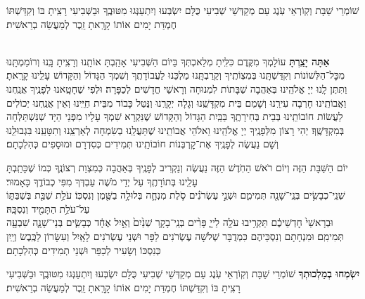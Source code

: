 \shabmusafpesukim

שׁוֹמְרֵי שַׁבָּת וְקֽוֹרְאֵי עֹֽנֶג \middot עַם מְקַדְּשֵׁי שְׁבִיעִי כֻּלָּם יִשְׂבְּעוּ וְיִתְעַנְּגוּ מִטּוּבֶֽךָ \middot וּבַשְּׁבִיעִי רָצִֽיתָ בּוֹ וְקִדַּשְׁתּוֹ \middot חֶמְדַּת יָמִים אוֹתוֹ קָרָֽאתָ זֵֽכֶר לְמַעֲשֵׂה בְרֵאשִׁית׃

\shabboskiddushhayom{} 

\begin{sometimes}

\label{shabbosroshchodesh}
\\
\textbf{אַתָּה יָצַֽרְתָּ}
עוֹלָמְךָ מִקֶּֽדֶם כִּלִּֽיתָ מְלַאכְתְּךָ בַּיוֹם הַשְּׁבִיעִי \middot אָהַֽבְתָּ אוֹתָֽנוּ וְרָצִֽיתָ בָּֽנוּ וְרוֹמַמְתָּֽנוּ מִכׇּל־הַלְּשׁוֹנוֹת וְקִדַּשְׁתָּֽנוּ בְּמִצְוֹתֶֽיךָ וְקֵרַבְתָּֽנוּ מַלְכֵּנוּ לַעֲבוֹדָתֶֽךָ וְשִׁמְךָ הַגָּדוֹל וְהַקָּדוֹשׁ עָלֵֽינוּ קָרָֽאתָ׃ וַתִּתֶּן לָֽנוּ יְיָ אֱלֹהֵֽינוּ בְּאַהֲבָה שַׁבָּתוֹת לִמְנוּחָה וְרָאשֵׁי חֳדָשִׁים לְכַפָּרָה׃ וּלְפִי שֶׁחָטָֽאנוּ לְפָנֶֽיךָ אֲנַֽחְנוּ וַאֲבוֹתֵֽינוּ חָרְבָה עִירֵֽנוּ וְשָׁמֵם בֵּית מִקְדָּשֵֽׁנוּ וְגָלָה יְקָרֵֽנוּ וְנֻּטַּל כָּבוֹד מִבֵּית חַיֵּֽינוּ \middot וְאֵין אֲנַֽחְנוּ יְכוֹלִים לַעֲשׂוֹת חוֹבוֹתֵֽינוּ בְּבֵית בְּחִירָתֶֽךָ בַּבַּֽיִת הַגָּדוֹל וְהַקָּדוֹשׁ שֶׁנִּקְרָא שִׁמְךָ עָלָיו מִפְּנֵי הַיָּד שְׁנִּשְׁתַּלְּחָה בְּמִקְדָּשֶֽׁךָ׃ 
יְהִי רָצוֹן מִלְּפָנֶֽיךָ יְיָ אֱלֹהֵֽינוּ וֵאלֹהֵי אֲבוֹתֵֽינוּ שֶׁתַּעֲלֵֽנוּ בְשִׂמְחָה לְאַרְצֵֽנוּ וְתִטָּעֵֽנוּ בִּגְבוּלֵֽנוּ וְשָׁם נַעֲשֶׂה לְפָנֶֽיךָ אֶת־קׇרְבְּנוֹת חוֹבוֹתֵֽינוּ תְּמִידִים כְּסִדְרָם וּמוּסָפִים כְּהִלְכָתָם׃

יוֹם הַשַּׁבָּת הַזֶּה וְיוֹם רֹאשׁ הַחֹֽדֶשׁ הַזֶּה נַעֲשֶׂה וְנַקְרִיב לְפָנֶֽיךָ בְּאַהֲבָה כְּמִצְוַת רְצוֹנֶֽךָ כְּמוֹ שֶׁכָּתַֽבְתָּ עָלֵֽינוּ בְּתוֹרָתֶֽךָ עַל יְדֵי מֹשֶׁה עַבְדְּךָ מִפִּי כְבוֹדֶֽךָ כָּאָמוּר׃ \\
שְׁנֵֽי־כְבָשִׂ֥ים בְּנֵֽי־שָׁנָ֖ה תְּמִימִ֑ם וּשְׁנֵ֣י עֶשְׂרֹנִ֗ים סֹ֧לֶת מִנְחָ֛ה בְּלוּלָ֥ה בַשֶּׁ֖מֶן וְנִסְכּֽוֹ׃ עֹלַ֥ת שַׁבַּ֖ת בְּשַׁבַּתּ֑וֹ עַל־עֹלַ֥ת הַתָּמִ֖יד וְנִסְכָּֽהּ׃ \\
וּבְרָאשֵׁי֙  חׇדְשֵׁיכֶ֔ם תַּקְרִ֥יבוּ עֹלָ֖ה לַייָ֑ פָּרִ֨ים בְּנֵֽי־בָקָ֤ר שְׁנַ֙יִם֙ וְאַ֣יִל אֶחָ֔ד כְּבָשִׂ֧ים בְּנֵי־שָׁנָ֛ה שִׁבְעָ֖ה תְּמִימִֽם׃ וּמִנְחָתָם וְנִסְכֵּיהֶם כִּמְדֻבָּר שְׁלֹשָׁה עֶשְׂרֹנִים לַפָּר וּשְׁנֵי עֶשְׂרֹנִים לָאָֽיִל וְעִשָּׂרוֹן לַכֶּֽבֶשׂ וְיַֽיִן כְּנִסְכּוֹ וְשָׂעִיר לְכַפֵּר וּשְׁנֵי תְמִידִים כְּהִלְכָתָם׃

\textbf{יִשְׂמְחוּ בְמַלְכוּתְךָ}
שׁוֹמְרֵי שַׁבָּת וְקֽוֹרְאֵי עֹֽנֶג \middot עַם מְקַדְּשֵׁי שְׁבִיעִי כֻּלָּם יִשְׂבְּעוּ וְיִתְעַנְּגוּ מִטּוּבֶֽךָ \middot וּבַשְּׁבִיעִי רָצִֽיתָ בּוֹ וְקִדַּשְׁתּוֹ \middot חֶמְדַּת יָמִים אוֹתוֹ קָרָֽאתָ זֵֽכֶר לְמַעֲשֵׂה בְרֵאשִׁית׃


\end{sometimes}
